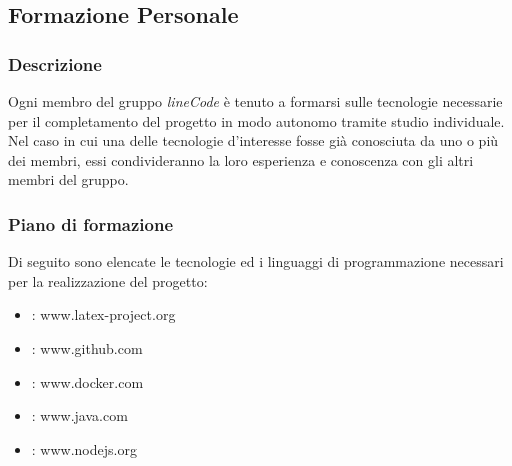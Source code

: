 \subsection{Formazione Personale}

	\subsubsection{Descrizione}
	Ogni membro del gruppo \textit{lineCode} è tenuto a formarsi sulle tecnologie necessarie per il completamento del progetto in modo autonomo tramite studio individuale. Nel caso in cui una delle tecnologie d'interesse fosse già conosciuta da uno o più dei membri, essi condivideranno la loro esperienza e conoscenza con gli altri membri del gruppo.

	\subsubsection{Piano di formazione}
	Di seguito sono elencate le tecnologie ed i linguaggi di programmazione necessari per la realizzazione del progetto:
	\begin{itemize}
		\item \glock{\LaTeX} : www.latex-project.org
		\item {} : www.github.com
		\item {} : www.docker.com
		\item {} : www.java.com
		\item {} : www.nodejs.org
	\end{itemize}

